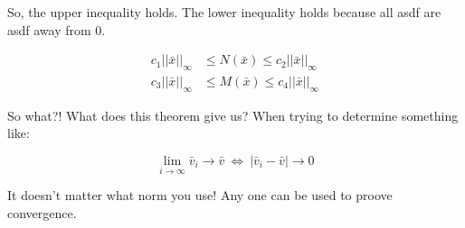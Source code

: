 So, the upper inequality holds. The lower inequality holds because all asdf are asdf away from 0.

\begin{align*}
  c_1 ||\bar{x}||_\infty &\leq N(\bar{x}) \leq c_2 ||\bar{x}||_\infty \\
  c_3 ||\bar{x}||_\infty &\leq M(\bar{x}) \leq c_4 ||\bar{x}||_\infty
\end{align*}

So what?! What does this theorem give us? When trying to determine something like:

\begin{equation}
  \lim_{i \rightarrow \infty} \bar{v}_i \rightarrow \bar{v}\ \Leftrightarrow\ |\bar{v}_i - \bar{v}| \rightarrow 0
\end{equation}

It doesn't matter what norm you use! Any one can be used to proove convergence.